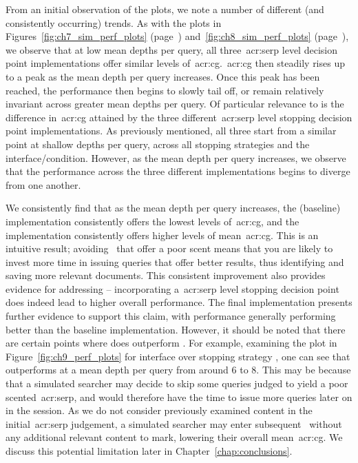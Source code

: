 From an initial observation of the plots, we note a number of different (and consistently occurring) trends. As with the plots in Figures~\ref{fig:ch7_sim_perf_plots} (page~\pageref{fig:ch7_sim_perf_plots}) and~\ref{fig:ch8_sim_perf_plots} (page~\pageref{fig:ch8_sim_perf_plots}), we observe that at low mean depths per query, all three~\gls{acr:serp} level decision point implementations offer similar levels of~\gls{acr:cg}.~\gls{acr:cg} then steadily rises up to a peak as the mean depth per query increases. Once this peak has been reached, the performance then begins to slowly tail off, or remain relatively invariant across greater mean depths per query. Of particular relevance to  is the difference in~\gls{acr:cg} attained by the three different~\gls{acr:serp} level stopping decision point implementations. As previously mentioned, all three start from a similar point at shallow depths per query, across all stopping strategies and the interface/condition. However, as the mean depth per query increases, we observe that the performance across the three different implementations begins to diverge from one another.

We consistently find that as the mean depth per query increases, the  (baseline) implementation consistently offers the lowest levels of~\gls{acr:cg}, and the  implementation consistently offers higher levels of mean~\gls{acr:cg}. This is an intuitive result; avoiding~ that offer a poor scent means that you are likely to invest more time in issuing queries that offer better results, thus identifying and saving more relevant documents. This consistent improvement also provides evidence for addressing  -- incorporating a~\gls{acr:serp} level stopping decision point does indeed lead to higher overall performance. The final implementation  presents further evidence to support this claim, with performance generally performing better than the baseline  implementation. However, it should be noted that there are certain points where  does outperform . For example, examining the plot in Figure~\ref{fig:ch9_perf_plots} for interface  over stopping strategy , one can see that  outperforms  at a mean depth per query from around $6$ to $8$. This may be because that a simulated searcher may decide to skip some queries judged to yield a poor scented~\gls{acr:serp}, and would therefore have the time to issue more queries later on in the session. As we do not consider previously examined content in the initial~\gls{acr:serp} judgement, a simulated searcher may enter subsequent~ without any additional relevant content to mark, lowering their overall mean~\gls{acr:cg}. We discuss this potential limitation later in Chapter~\ref{chap:conclusions}.

